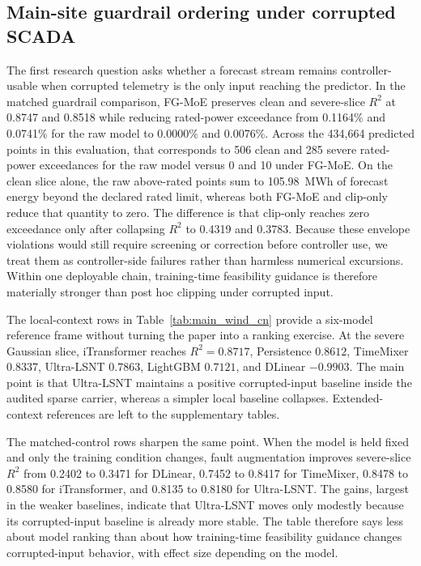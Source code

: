 \documentclass[review,1p,times]{elsarticle}
\begin{document}
\subsection{Main-site guardrail ordering under corrupted SCADA}
\label{subsec:results_main}
\label{subsec:results_robustness}
\label{subsubsec:universal_noise}
The first research question asks whether a forecast stream remains controller-usable when corrupted telemetry is the only input reaching the predictor. In the matched guardrail comparison, FG-MoE preserves clean and severe-slice $R^2$ at 0.8747 and 0.8518 while reducing rated-power exceedance from 0.1164\% and 0.0741\% for the raw model to 0.0000\% and 0.0076\%. Across the 434{,}664 predicted points in this evaluation, that corresponds to 506 clean and 285 severe rated-power exceedances for the raw model versus 0 and 10 under FG-MoE. On the clean slice alone, the raw above-rated points sum to 105.98~MWh of forecast energy beyond the declared rated limit, whereas both FG-MoE and clip-only reduce that quantity to zero. The difference is that clip-only reaches zero exceedance only after collapsing $R^2$ to 0.4319 and 0.3783. Because these envelope violations would still require screening or correction before controller use, we treat them as controller-side failures rather than harmless numerical excursions. Within one deployable chain, training-time feasibility guidance is therefore materially stronger than post hoc clipping under corrupted input.

The local-context rows in Table~\ref{tab:main_wind_cn} provide a six-model reference frame without turning the paper into a ranking exercise. At the severe Gaussian slice, iTransformer reaches $R^2=0.8717$, Persistence $0.8612$, TimeMixer $0.8337$, Ultra-LSNT $0.7863$, LightGBM $0.7121$, and DLinear $-0.9903$. The main point is that Ultra-LSNT maintains a positive corrupted-input baseline inside the audited sparse carrier, whereas a simpler local baseline collapses. Extended-context references are left to the supplementary tables.

The matched-control rows sharpen the same point. When the model is held fixed and only the training condition changes, fault augmentation improves severe-slice $R^2$ from 0.2402 to 0.3471 for DLinear, 0.7452 to 0.8417 for TimeMixer, 0.8478 to 0.8580 for iTransformer, and 0.8135 to 0.8180 for Ultra-LSNT. The gains, largest in the weaker baselines, indicate that Ultra-LSNT moves only modestly because its corrupted-input baseline is already more stable. The table therefore says less about model ranking than about how training-time feasibility guidance changes corrupted-input behavior, with effect size depending on the model.
\end{document}
